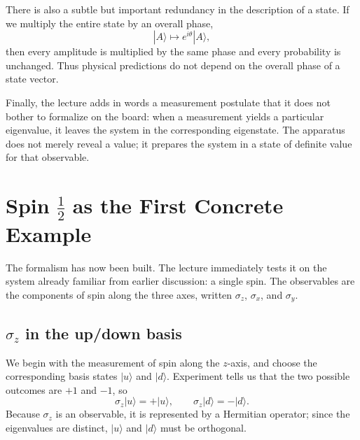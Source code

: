 There is also a subtle but important redundancy in the description of a state. If we multiply the entire state by an overall phase,
\begin{equation}
|A\rangle \longmapsto e^{i\theta}|A\rangle,
\end{equation}
then every amplitude is multiplied by the same phase and every probability is unchanged. Thus physical predictions do not depend on the overall phase of a state vector.

Finally, the lecture adds in words a measurement postulate that it does not bother to formalize on the board: when a measurement yields a particular eigenvalue, it leaves the system in the corresponding eigenstate. The apparatus does not merely reveal a value; it prepares the system in a state of definite value for that observable.

\section{Spin \texorpdfstring{\(\frac{1}{2}\)}{1/2} as the First Concrete Example}

The formalism has now been built. The lecture immediately tests it on the system already familiar from earlier discussion: a single spin. The observables are the components of spin along the three axes, written \(\sigma_z\), \(\sigma_x\), and \(\sigma_y\).

\subsection{\texorpdfstring{\(\sigma_z\)}{sigma z} in the up/down basis}

We begin with the measurement of spin along the \(z\)-axis, and choose the corresponding basis states \(|u\rangle\) and \(|d\rangle\). Experiment tells us that the two possible outcomes are \(+1\) and \(-1\), so
\begin{equation}
\sigma_z |u\rangle = +|u\rangle,
\qquad
\sigma_z |d\rangle = -|d\rangle.
\end{equation}
Because \(\sigma_z\) is an observable, it is represented by a Hermitian operator; since the eigenvalues are distinct, \(|u\rangle\) and \(|d\rangle\) must be orthogonal.

